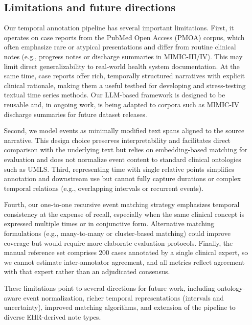 \documentclass[pdflatex,sn-mathphys-num]{sn-jnl}%
\theoremstyle{thmstyleone}%
\theoremstyle{thmstyletwo}%
\theoremstyle{thmstylethree}%
\begin{document}
\subsection{Limitations and future directions}

Our temporal annotation pipeline has several important limitations. First, it operates on case reports from the PubMed Open Access (PMOA) corpus, which often emphasize rare or atypical presentations and differ from routine clinical notes (e.g., progress notes or discharge summaries in MIMIC-III/IV). This may limit direct generalizability to real-world health system documentation. At the same time, case reports offer rich, temporally structured narratives with explicit clinical rationale, making them a useful testbed for developing and stress-testing textual time series methods. Our LLM-based framework is designed to be reusable and, in ongoing work, is being adapted to corpora such as MIMIC-IV discharge summaries for future dataset releases.

Second, we model events as minimally modified text spans aligned to the source narrative. This design choice preserves interpretability and facilitates direct comparison with the underlying text but relies on embedding-based matching for evaluation and does not normalize event content to standard clinical ontologies such as UMLS. Third, representing time with single relative points simplifies annotation and downstream use but cannot fully capture durations or complex temporal relations (e.g., overlapping intervals or recurrent events).

Fourth, our one-to-one recursive event matching strategy emphasizes temporal consistency at the expense of recall, especially when the same clinical concept is expressed multiple times or in conjunctive form. Alternative matching formulations (e.g., many-to-many or cluster-based matching) could improve coverage but would require more elaborate evaluation protocols. Finally, the manual reference set comprises 200 cases annotated by a single clinical expert, so we cannot estimate inter-annotator agreement, and all metrics reflect agreement with that expert rather than an adjudicated consensus.

These limitations point to several directions for future work, including ontology-aware event normalization, richer temporal representations (intervals and uncertainty), improved matching algorithms, and extension of the pipeline to diverse EHR-derived note types.


\end{document}
